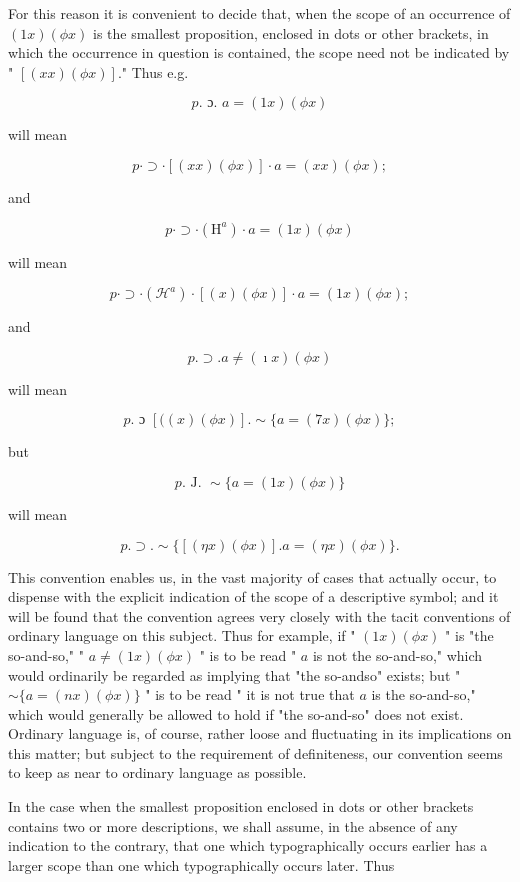 \documentclass[10pt]{article}
\begin{document}
For this reason it is convenient to decide that, when the scope of an occurrence of $(1 x)(\phi x)$ is the smallest proposition, enclosed in dots or other brackets, in which the occurrence in question is contained, the scope need not be indicated by " $[(x x)(\phi x)]$." Thus e.g.

$$
p . \text { ɔ. } a=(1 x)(\phi x)
$$

will mean

$$
p \cdot \supset \cdot[(x x)(\phi x)] \cdot a=(x x)(\phi x) ;
$$

and

$$
p \cdot \supset \cdot\left(\mathrm{H}^{a}\right) \cdot a=(1 x)(\phi x)
$$

will mean

$$
p \cdot \supset \cdot\left(\mathcal{H}^{a}\right) \cdot[(x)(\phi x)] \cdot a=(1 x)(\phi x) ;
$$

and

$$
p . \supset . a \neq(\imath x)(\phi x)
$$

will mean

$$
p . \text { ɔ }[((x)(\phi x)] . \sim\{a=(7 x)(\phi x)\} ;
$$

but

$$
p . \text { J. } \sim\{a=(1 x)(\phi x)\}
$$

will mean

$$
p . \supset . \sim\{[(\eta x)(\phi x)] . a=(\eta x)(\phi x)\} .
$$

This convention enables us, in the vast majority of cases that actually occur, to dispense with the explicit indication of the scope of a descriptive symbol; and it will be found that the convention agrees very closely with the tacit conventions of ordinary language on this subject. Thus for example, if " $(1 x)(\phi x)$ " is "the so-and-so," " $a \neq(1 x)(\phi x)$ " is to be read " $a$ is not the so-and-so," which would ordinarily be regarded as implying that "the so-andso" exists; but " $\sim\{a=(n x)(\phi x)\}$ " is to be read " it is not true that $a$ is the so-and-so," which would generally be allowed to hold if "the so-and-so" does not exist. Ordinary language is, of course, rather loose and fluctuating in its implications on this matter; but subject to the requirement of definiteness, our convention seems to keep as near to ordinary language as possible.

In the case when the smallest proposition enclosed in dots or other brackets contains two or more descriptions, we shall assume, in the absence of any indication to the contrary, that one which typographically occurs earlier has a larger scope than one which typographically occurs later. Thus
\end{document}
